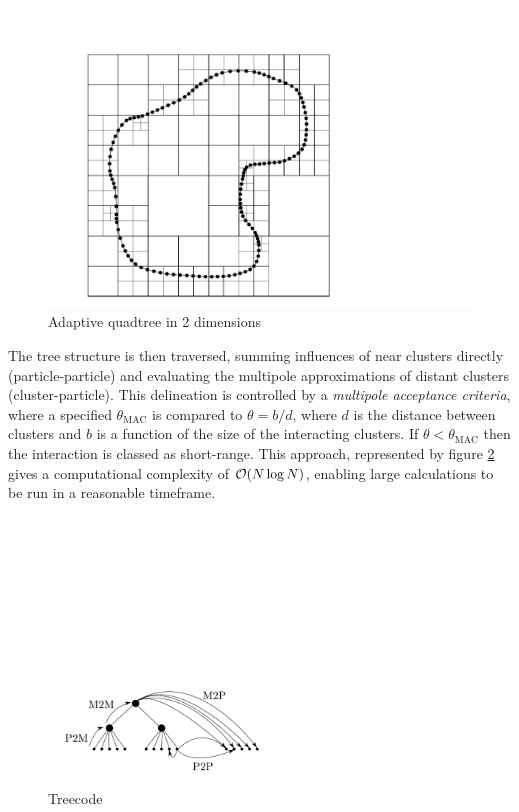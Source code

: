 \begin{figure}[h]
	\centering
	\includegraphics[width=12cm]{img/Quadtree.pdf}
	\caption{Adaptive quadtree in 2 dimensions}
	\label{fig:quadtree}
\end{figure}

The tree structure is then traversed, summing influences of near clusters directly (particle-particle) and evaluating the multipole approximations of distant clusters (cluster-particle). This delineation is controlled by a \emph{multipole acceptance criteria}, where a specified $\theta_{\text{MAC}}$ is compared to $\theta = b/d$, where $d$ is the distance between clusters and $b$ is a function of the size of the interacting clusters. If $\theta < \theta_{\text{MAC}}$ then the interaction is classed as short-range. This approach, represented by figure \ref{fig:treecode} gives a computational complexity of $\mathcal{O}(N\log N)$, enabling large calculations to be run in a reasonable timeframe.

\begin{figure}[h]
	\centering
	\includegraphics[width=10cm]{img/Treecode.pdf}
	\caption{Treecode}
	\label{fig:treecode}
\end{figure}

